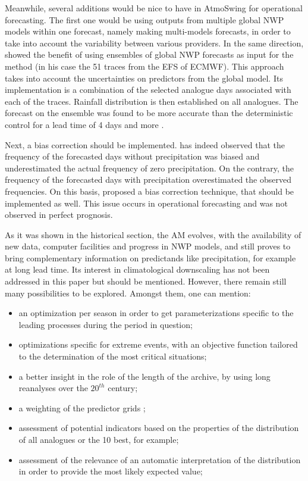 \documentclass[review]{elsarticle}
\begin{document}
Meanwhile, several additions would be nice to have in AtmoSwing for operational forecasting. The first one would be using outputs from multiple global NWP models within one forecast, namely making multi-models forecasts, in order to take into account the variability between various providers. In the same direction, \citet{Thevenot2004} showed the benefit of using ensembles of global NWP forecasts as input for the method (in his case the 51 traces from the EFS of ECMWF). This approach takes into account the uncertainties on predictors from the global model. Its implementation is a combination of the selected analogue days associated with each of the traces. Rainfall distribution is then established on all analogues. The forecast on the ensemble was found to be more accurate than the deterministic control for a lead time of 4 days and more \citep{Thevenot2004}. 

Next, a bias correction should be implemented. \citet{Marty2010} has indeed observed that the frequency of the forecasted days without precipitation was biased and underestimated the actual frequency of zero precipitation. On the contrary, the frequency of the forecasted days with precipitation overestimated the observed frequencies. On this basis, \citet{Marty2010} proposed a bias correction technique, that should be implemented as well. This issue occurs in operational forecasting and was not observed in perfect prognosis.

As it was shown in the historical section, the AM evolves, with the availability of new data, computer facilities and progress in NWP models, and still proves to bring complementary information on predictands like precipitation, for example at long lead time. Its interest in climatological downscaling has not been addressed in this paper but should be mentioned. However, there remain still many possibilities to be explored. Amongst them, one can mention:

\begin{itemize}
	\item an optimization per season in order to get parameterizations specific to the leading processes during the period in question;
	\item optimizations specific for extreme events, with an objective function tailored to the determination of the most critical situations;
	\item a better insight in the role of the length of the archive, by using long reanalyses over the $20^{th}$ century;	
	\item a weighting of the predictor grids \citep[see][]{Bliefernicht2010};
	\item assessment of potential indicators based on the properties of the distribution of all analogues or the 10 best, for example;
	\item assessment of the relevance of an automatic interpretation of the distribution in order to provide the most likely expected value;
\end{itemize}
\end{document}
